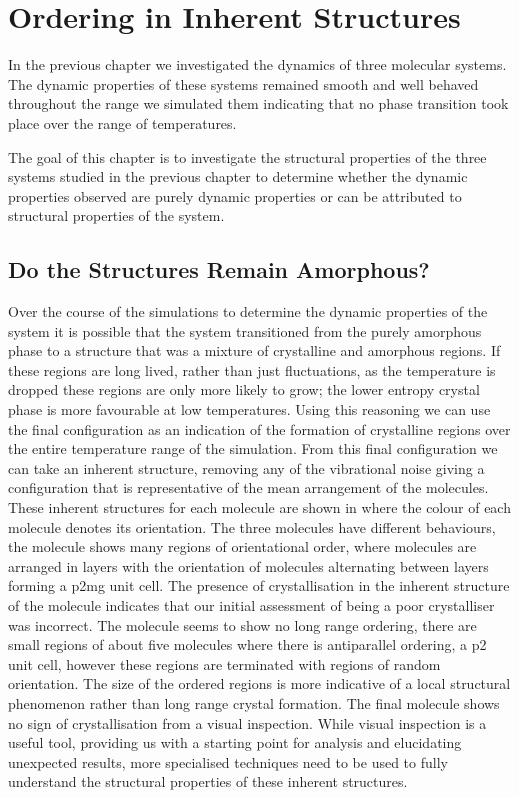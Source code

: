 \chapter{Ordering in Inherent Structures}

In the previous chapter we investigated the dynamics of three molecular systems. The dynamic properties of these systems remained smooth and well behaved throughout the range we simulated them indicating that no phase transition took place over the range of temperatures. 

The goal of this chapter is to investigate the structural properties of the three systems studied in the previous chapter to determine whether the dynamic properties observed are purely dynamic properties or can be attributed to structural properties of the system.

\section{Do the Structures Remain Amorphous?}

Over the course of the simulations to determine the dynamic properties of the system it is possible that the system transitioned from the purely amorphous phase to a structure that was a mixture of crystalline and amorphous regions. If these regions are long lived, rather than just fluctuations, as the temperature is dropped these regions are only more likely to grow; the lower entropy crystal phase is more favourable at low temperatures. Using this reasoning we can use the final configuration as an indication of the formation of crystalline regions over the entire temperature range of the simulation. From this final configuration we can take an inherent structure, removing any of the vibrational noise giving a configuration that is representative of the mean arrangement of the molecules. These inherent structures for each molecule are shown in  where the colour of each molecule denotes its orientation. The three molecules have different behaviours, the \sone molecule  shows many regions of orientational order, where molecules are arranged in layers with the orientation of molecules alternating between layers forming a p2mg unit cell. The presence of crystallisation in the inherent structure of the \sone molecule indicates that our initial assessment of being a poor crystalliser was incorrect. The \scon molecule  seems to show no long range ordering, there are small regions of about five molecules where there is antiparallel ordering, a p2 unit cell, however these regions are terminated with regions of random orientation. The size of the ordered regions is more indicative of a local structural phenomenon rather than long range crystal formation. The final molecule \tri {} shows no sign of crystallisation from a visual inspection. While visual inspection is a useful tool, providing us with a starting point for analysis and elucidating unexpected results, more specialised techniques need to be used to fully understand the structural properties of these inherent structures.


